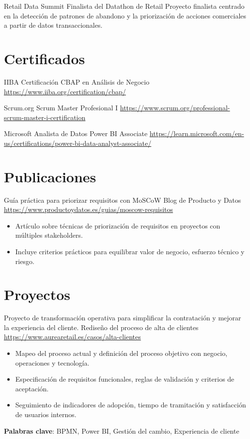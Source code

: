 \documentclass[a4paper, serif, 10pt]{moderncv}
\begin{document}
        {Retail Data Summit}
        {Finalista del Datathon de Retail}
        {}
        {}
        {Proyecto finalista centrado en la detección de patrones de abandono y la priorización de acciones comerciales a partir de datos transaccionales.}
\section{Certificados}

        {IIBA}
        {Certificación CBAP en Análisis de Negocio}
        {\url{https://www.iiba.org/certification/cbap/}}
        {}
        {}

        {Scrum.org}
        {Scrum Master Profesional I}
        {\url{https://www.scrum.org/professional-scrum-master-i-certification}}
        {}
        {}

        {Microsoft}
        {Analista de Datos Power BI Associate}
        {\url{https://learn.microsoft.com/en-us/certifications/power-bi-data-analyst-associate/}}
        {}
        {}
\section{Publicaciones}

        {Guía práctica para priorizar requisitos con MoSCoW}
        {Blog de Producto y Datos}
        {\url{https://www.productoydatos.es/guias/moscow-requisitos}}
        {}
        {\begin{itemize}
\item Artículo sobre técnicas de priorización de requisitos en proyectos con múltiples stakeholders.
\item Incluye criterios prácticos para equilibrar valor de negocio, esfuerzo técnico y riesgo.
\end{itemize}}
\section{Proyectos}

        {Proyecto de transformación operativa para simplificar la contratación y mejorar la experiencia del cliente.}
        {Rediseño del proceso de alta de clientes}
        {\url{https://www.aurearetail.es/casos/alta-clientes}}
        {}
        {\begin{itemize}
\item Mapeo del proceso actual y definición del proceso objetivo con negocio, operaciones y tecnología.
\item Especificación de requisitos funcionales, reglas de validación y criterios de aceptación.
\item Seguimiento de indicadores de adopción, tiempo de tramitación y satisfacción de usuarios internos.
\end{itemize}
\textbf{Palabras clave}: BPMN, Power BI, Gestión del cambio, Experiencia de cliente}
\end{document}
